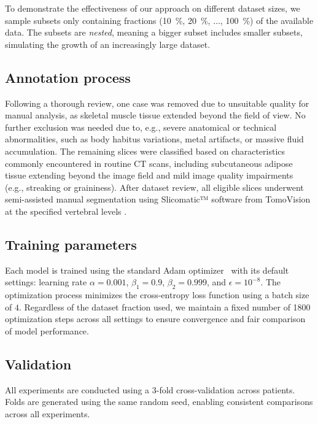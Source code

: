 \documentclass[conference]{IEEEtran}
\begin{document}
To demonstrate the effectiveness of our approach on different dataset sizes, we sample subsets only containing fractions (\SI{10}{\percent}, \SI{20}{\percent}, $\dots$, \SI{100}{\percent}) of the available data.
The subsets are \emph{nested}, meaning a bigger subset includes smaller subsets, simulating the growth of an increasingly large dataset.

\subsection{Annotation process}
Following a thorough review, one case was removed due to unsuitable quality for manual analysis, as skeletal muscle tissue extended beyond the field of view. No further exclusion was needed due to, e.g., severe anatomical or technical abnormalities, such as body habitus variations, metal artifacts, or massive fluid accumulation. The remaining slices were classified based on characteristics commonly encountered in routine CT scans, including subcutaneous adipose tissue extending beyond the image field and mild image quality impairments (e.g., streaking or graininess). After dataset review, all eligible slices underwent semi-assisted manual segmentation using Slicomatic™ software from TomoVision at the specified vertebral levels \cite{baumgartner2023association}.

\subsection{Training parameters}
Each model is trained using the standard Adam optimizer~\cite{kingma2014adam} with its default settings: learning rate $\alpha=0.001$, $\beta_1=0.9$, $\beta_2=0.999$, and $\epsilon=10^{-8}$. The optimization process minimizes the cross-entropy loss function using a batch size of $4$.
Regardless of the dataset fraction used, we maintain a fixed number of \num{1800} optimization steps across all settings to ensure convergence and fair comparison of model performance.

\subsection{Validation}
All experiments are conducted using a 3-fold cross-validation across patients.
Folds are generated using the same random seed, enabling consistent comparisons across all experiments.
\end{document}
